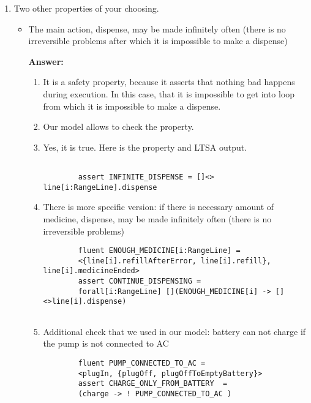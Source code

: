 \documentclass{article}
\begin{document}
\begin{enumerate}
    \item Two other properties of your choosing.
    
    \begin{itemize}
    \item The main action, dispense, may be made infinitely often (there is no irreversible problems after which it is impossible to make a dispense)
    
    \textbf{Answer:}
    \begin{enumerate}
    	\item It is a safety property, because it asserts that nothing bad happens during execution. In this case, that it is impossible to get into loop from which it is impossible to make a dispense.
    	\item  Our model allows to check the property. 
    	\item Yes, it is true. Here is the property and LTSA output.
    	\begin{verbatim}
    	
    	assert INFINITE_DISPENSE = []<> line[i:RangeLine].dispense
    	 \end{verbatim}
    	
    \item	There is more specific version: if there is necessary amount of medicine, dispense, may be made infinitely often (there is no irreversible problems)
    
    \begin{verbatim}
    	fluent ENOUGH_MEDICINE[i:RangeLine] =
    	<{line[i].refillAfterError, line[i].refill}, line[i].medicineEnded>
    	assert CONTINUE_DISPENSING =
    	forall[i:RangeLine] [](ENOUGH_MEDICINE[i] -> [] <>line[i].dispense)
    	
    	\end{verbatim}
    	
    	\item Additional check that we used in our model: battery can not charge if the pump is not connected to AC
    	
    	 \begin{verbatim}
    	fluent PUMP_CONNECTED_TO_AC =
    	<plugIn, {plugOff, plugOffToEmptyBattery}>
    	assert CHARGE_ONLY_FROM_BATTERY  = 
    	(charge -> ! PUMP_CONNECTED_TO_AC )
    	
    \end{verbatim}
    \end{enumerate}
    \end{itemize}
     
    
    
    
\end{enumerate}
\end{document}
